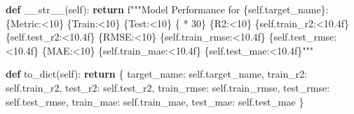 \documentclass[
  letterpaper,
  DIV=11,
  numbers=noendperiod]{scrartcl}
\newenvironment{Shaded}{\begin{snugshade}}{\end{snugshade}}
\newcommand{\ControlFlowTok}[1]{\textcolor[rgb]{0.00,0.23,0.31}{\textbf{#1}}}
\newcommand{\DecValTok}[1]{\textcolor[rgb]{0.68,0.00,0.00}{#1}}
\newcommand{\FunctionTok}[1]{\textcolor[rgb]{0.28,0.35,0.67}{#1}}
\newcommand{\KeywordTok}[1]{\textcolor[rgb]{0.00,0.23,0.31}{\textbf{#1}}}
\newcommand{\NormalTok}[1]{\textcolor[rgb]{0.00,0.23,0.31}{#1}}
\newcommand{\OperatorTok}[1]{\textcolor[rgb]{0.37,0.37,0.37}{#1}}
\newcommand{\SpecialCharTok}[1]{\textcolor[rgb]{0.37,0.37,0.37}{#1}}
\newcommand{\SpecialStringTok}[1]{\textcolor[rgb]{0.13,0.47,0.30}{#1}}
\newcommand{\StringTok}[1]{\textcolor[rgb]{0.13,0.47,0.30}{#1}}
\newcommand{\VariableTok}[1]{\textcolor[rgb]{0.07,0.07,0.07}{#1}}
\begin{document}
\begin{Shaded}
\begin{Highlighting}[]
    \KeywordTok{def} \FunctionTok{\_\_str\_\_}\NormalTok{(}\VariableTok{self}\NormalTok{):}
        \ControlFlowTok{return} \SpecialStringTok{f"""Model Performance for }\SpecialCharTok{\{}\VariableTok{self}\SpecialCharTok{.}\NormalTok{target\_name}\SpecialCharTok{\}}\SpecialStringTok{:}
\SpecialCharTok{\{}\StringTok{\textquotesingle{}Metric\textquotesingle{}}\SpecialCharTok{:\textless{}10\}}\SpecialStringTok{ }\SpecialCharTok{\{}\StringTok{\textquotesingle{}Train\textquotesingle{}}\SpecialCharTok{:\textless{}10\}}\SpecialStringTok{ }\SpecialCharTok{\{}\StringTok{\textquotesingle{}Test\textquotesingle{}}\SpecialCharTok{:\textless{}10\}}
\SpecialCharTok{\{}\StringTok{\textquotesingle{}{-}\textquotesingle{}} \OperatorTok{*} \DecValTok{30}\SpecialCharTok{\}}
\SpecialCharTok{\{}\StringTok{\textquotesingle{}R2\textquotesingle{}}\SpecialCharTok{:\textless{}10\}}\SpecialStringTok{ }\SpecialCharTok{\{}\VariableTok{self}\SpecialCharTok{.}\NormalTok{train\_r2}\SpecialCharTok{:\textless{}10.4f\}}\SpecialStringTok{ }\SpecialCharTok{\{}\VariableTok{self}\SpecialCharTok{.}\NormalTok{test\_r2}\SpecialCharTok{:\textless{}10.4f\}}
\SpecialCharTok{\{}\StringTok{\textquotesingle{}RMSE\textquotesingle{}}\SpecialCharTok{:\textless{}10\}}\SpecialStringTok{ }\SpecialCharTok{\{}\VariableTok{self}\SpecialCharTok{.}\NormalTok{train\_rmse}\SpecialCharTok{:\textless{}10.4f\}}\SpecialStringTok{ }\SpecialCharTok{\{}\VariableTok{self}\SpecialCharTok{.}\NormalTok{test\_rmse}\SpecialCharTok{:\textless{}10.4f\}}
\SpecialCharTok{\{}\StringTok{\textquotesingle{}MAE\textquotesingle{}}\SpecialCharTok{:\textless{}10\}}\SpecialStringTok{ }\SpecialCharTok{\{}\VariableTok{self}\SpecialCharTok{.}\NormalTok{train\_mae}\SpecialCharTok{:\textless{}10.4f\}}\SpecialStringTok{ }\SpecialCharTok{\{}\VariableTok{self}\SpecialCharTok{.}\NormalTok{test\_mae}\SpecialCharTok{:\textless{}10.4f\}}\SpecialStringTok{"""}

    \KeywordTok{def}\NormalTok{ to\_dict(}\VariableTok{self}\NormalTok{):}
        \ControlFlowTok{return}\NormalTok{ \{}
            \StringTok{\textquotesingle{}target\_name\textquotesingle{}}\NormalTok{: }\VariableTok{self}\NormalTok{.target\_name,}
            \StringTok{\textquotesingle{}train\_r2\textquotesingle{}}\NormalTok{: }\VariableTok{self}\NormalTok{.train\_r2,}
            \StringTok{\textquotesingle{}test\_r2\textquotesingle{}}\NormalTok{: }\VariableTok{self}\NormalTok{.test\_r2,}
            \StringTok{\textquotesingle{}train\_rmse\textquotesingle{}}\NormalTok{: }\VariableTok{self}\NormalTok{.train\_rmse,}
            \StringTok{\textquotesingle{}test\_rmse\textquotesingle{}}\NormalTok{: }\VariableTok{self}\NormalTok{.test\_rmse,}
            \StringTok{\textquotesingle{}train\_mae\textquotesingle{}}\NormalTok{: }\VariableTok{self}\NormalTok{.train\_mae,}
            \StringTok{\textquotesingle{}test\_mae\textquotesingle{}}\NormalTok{: }\VariableTok{self}\NormalTok{.test\_mae}
\NormalTok{        \}}


\end{Highlighting}
\end{Shaded}
\end{document}
